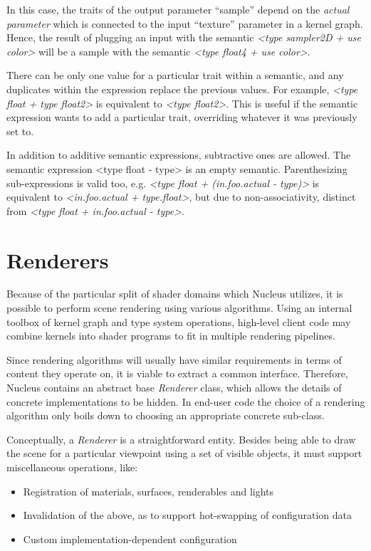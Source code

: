 
In this case, the traits of the output parameter ``sample'' depend on the \emph{actual parameter} which is connected to the input ``texture'' parameter in a kernel graph. Hence, the result of plugging an input with the semantic \emph{<type sampler2D + use color>} will be a sample with the semantic \emph{<type float4 + use color>}.

There can be only one value for a particular trait within a semantic, and any duplicates within the expression replace the previous values. For example, \emph{<type float + type float2>} is equivalent to \emph{<type float2>}. This is useful if the semantic expression wants to add a particular trait, overriding whatever it was previously set to.

In addition to additive semantic expressions, subtractive ones are allowed. The semantic expression <type float - type> is an empty semantic. Parenthesizing sub-expressions is valid too, e.g. \emph{<type float + (in.foo.actual - type)>} is equivalent to \emph{<in.foo.actual + type.float>}, but due to non-associativity, distinct from \emph{<type float + in.foo.actual - type>}.

\section{Renderers}
\label{sec:Renderers}

Because of the particular split of shader domains which Nucleus utilizes, it is possible to perform scene rendering using various algorithms. Using an internal toolbox of kernel graph and type system operations, high-level client code may combine kernels into shader programs to fit in multiple rendering pipelines.

Since rendering algorithms will usually have similar requirements in terms of content they operate on, it is viable to extract a common interface. Therefore, Nucleus contains an abstract base \emph{Renderer} class, which allows the details of concrete implementations to be hidden. In end-user code the choice of a rendering algorithm only boils down to choosing an appropriate concrete sub-class.

Conceptually, a \emph{Renderer} is a straightforward entity. Besides being able to draw the scene for a particular viewpoint using a set of visible objects, it must support miscellaneous operations, like:

\begin{itemize}
\item Registration of materials, surfaces, renderables and lights
\item Invalidation of the above, as to support hot-swapping of configuration data
\item Custom implementation-dependent configuration
\end{itemize}

